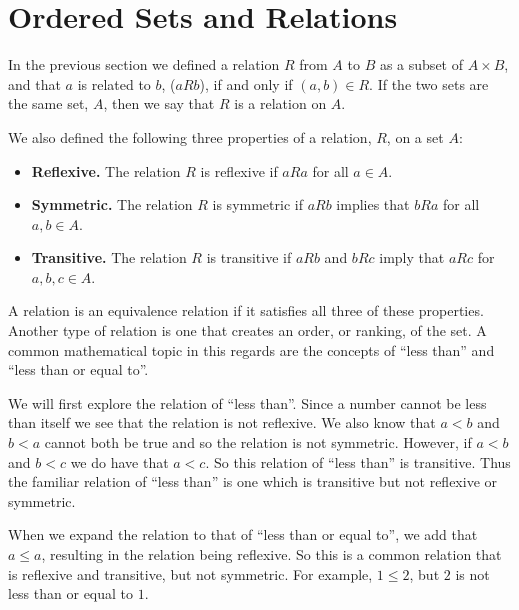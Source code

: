 \documentclass[
]{book}
\providecommand{\tightlist}{%
  \setlength{\itemsep}{0pt}\setlength{\parskip}{0pt}}
\theoremstyle{definition}
\theoremstyle{definition}
\theoremstyle{definition}
\theoremstyle{remark}
\begin{document}
\hypertarget{ordered-sets-and-relations}{%
\section{Ordered Sets and Relations}\label{ordered-sets-and-relations}}

In the previous section we defined a relation \(R\) from \(A\) to \(B\) as a subset of \(A\times B\), and that \(a\) is related to \(b\), (\(aRb\)), if and only if \((a,b)\in R\). If the two sets are the same set, \(A\), then we say that \(R\) is a relation on \(A\).

We also defined the following three properties of a relation, \(R\), on a set \(A\):

\begin{itemize}
\tightlist
\item
  \textbf{Reflexive.} The relation \(R\) is reflexive if \(aRa\) for all \(a\in A\).
\item
  \textbf{Symmetric.} The relation \(R\) is symmetric if \(aRb\) implies that \(bRa\) for all \(a,b\in A\).
\item
  \textbf{Transitive.} The relation \(R\) is transitive if \(aRb\) and \(bRc\) imply that \(aRc\) for \(a,b,c\in A\).
\end{itemize}

A relation is an equivalence relation if it satisfies all three of these properties. Another type of relation is one that creates an order, or ranking, of the set. A common mathematical topic in this regards are the concepts of ``less than'' and ``less than or equal to''.

We will first explore the relation of ``less than''. Since a number cannot be less than itself we see that the relation is not reflexive. We also know that \(a<b\) and \(b<a\) cannot both be true and so the relation is not symmetric. However, if \(a<b\) and \(b<c\) we do have that \(a<c\). So this relation of ``less than'' is transitive. Thus the familiar relation of ``less than'' is one which is transitive but not reflexive or symmetric.

When we expand the relation to that of ``less than or equal to'', we add that \(a\leq a\), resulting in the relation being reflexive. So this is a common relation that is reflexive and transitive, but not symmetric. For example, \(1\leq 2\), but \(2\) is not less than or equal to \(1\).
\end{document}
